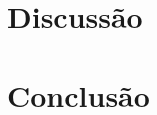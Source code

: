 \documentclass[12pt]{article}
\begin{document}


\section{Discussão}



\section{Conclusão}



\FloatBarrier


\end{document}
